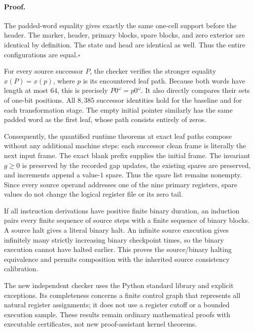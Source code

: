 \paragraph{Proof.}
The padded-word equality gives exactly the same one-cell support before
the header.  The marker, header, primary blocks, spare blocks, and zero
exterior are identical by definition.  The state and head are identical
as well.  Thus the entire configurations are equal.\hfill$\square$

For every source successor $P$, the checker verifies the stronger equality
$x(P)=x(p)$, where $p$ is its encountered leaf path.  Because both words
have length at most $64$, this is precisely $P0^\omega=p0^\omega$.
It also directly compares their sets of one-bit positions.  All $8,385$
successor identities hold for the baseline and for each transformation
stage.  The empty initial pointer similarly has the same padded word as
the first leaf, whose path consists entirely of zeros.

Consequently, the quantified runtime theorems at exact leaf paths compose
without any additional machine steps: each successor clean frame is
literally the next input frame.  The exact blank prefix supplies the
initial frame.  The invariant $g\geq0$ is preserved by the recorded gap
updates, the existing spares are preserved, and increments append a
value-$1$ spare.  Thus the spare list remains nonempty.  Since every
source operand addresses one of the nine primary registers, spare values
do not change the logical register file or its zero tail.

If all instruction derivations have positive finite binary duration, an
induction pairs every finite sequence of source steps with a finite
sequence of binary blocks.  A source halt gives a literal binary halt.
An infinite source execution gives infinitely many strictly increasing
binary checkpoint times, so the binary execution cannot have halted
earlier.  This proves the source/binary halting equivalence and permits
composition with the inherited source consistency calibration.

The new independent checker uses the Python standard library and explicit
exceptions.  Its completeness concerns a finite control graph that
represents all natural register assignments; it does not use a register
cutoff or a bounded execution sample.  These results remain ordinary
mathematical proofs with executable certificates, not new proof-assistant
kernel theorems.
